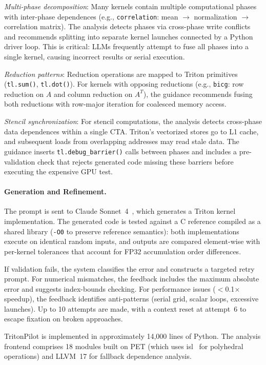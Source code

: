 \documentclass[sigconf]{acmart}
\newcommand{\sysname}{TritonPilot\xspace}
\newcommand{\pet}{PET\xspace}
\begin{document}
\emph{Multi-phase decomposition}: Many kernels contain multiple
computational phases with inter-phase dependences (e.g.,
\texttt{correlation}: mean $\to$ normalization $\to$ correlation
matrix).  The analysis detects phases via cross-phase write conflicts
and recommends splitting into separate kernel launches connected by a
Python driver loop.  This is critical: LLMs frequently attempt to fuse
all phases into a single kernel, causing incorrect results or serial
execution.

\emph{Reduction patterns}: Reduction operations are mapped to Triton
primitives (\texttt{tl.sum()}, \texttt{tl.dot()}).  For kernels with
opposing reductions (e.g., \texttt{bicg}: row reduction on $A$ and
column reduction on $A^T$), the guidance recommends fusing both
reductions with row-major iteration for coalesced memory access.

\emph{Stencil synchronization}: For stencil computations, the analysis
detects cross-phase data dependences within a single CTA.  Triton's
vectorized stores go to L1 cache, and subsequent loads from overlapping
addresses may read stale data.  The guidance inserts
\texttt{tl.debug\_barrier()} calls between phases and includes a
pre-validation check that rejects generated code missing these barriers
before executing the expensive GPU test.

\paragraph{Generation and Refinement.}
The prompt is sent to Claude Sonnet~4~\cite{anthropic2025claude}, which
generates a Triton kernel implementation.  The generated code is tested
against a C reference compiled as a shared library (\texttt{-O0} to
preserve reference semantics): both implementations execute on
identical random inputs, and outputs are compared element-wise with
per-kernel tolerances that account for FP32 accumulation order
differences.

If validation fails, the system classifies the error and constructs a
targeted retry prompt.  For numerical mismatches, the feedback includes
the maximum absolute error and suggests index-bounds checking.  For
performance issues ($<$0.1$\times$ speedup), the feedback identifies
anti-patterns (serial grid, scalar loops, excessive launches).  Up to
10 attempts are made, with a context reset at attempt~6 to escape
fixation on broken approaches.

\sysname is implemented in approximately 14,000 lines of Python.
The analysis frontend comprises 18 modules built on \pet{} (which uses
isl~\cite{verdoolaege2010isl} for polyhedral operations) and LLVM~17
for fallback dependence analysis.
\end{document}
